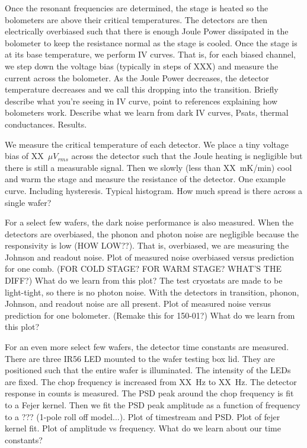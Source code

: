Once the resonant frequencies are determined, the stage is heated so the bolometers are above their critical temperatures. 
The detectors are then electrically overbiased such that there is enough Joule Power dissipated in the bolometer to keep the resistance normal as the stage is cooled. 
Once the stage is at its base temperature, we perform IV curves. 
That is, for each biased channel, we step down the voltage bias (typically in steps of XXX) and measure the current across the bolometer. 
As the Joule Power decreases, the detector temperature decreases and we call this dropping into the transition. 
Briefly describe what you're seeing in IV curve, point to references explaining how bolometers work. 
Describe what we learn from dark IV curves, Psats, thermal conductances. 
Results. 

We measure the critical temperature of each detector. 
We place a tiny voltage bias of XX~$\mu V_{rms}$ across the detector such that the Joule heating is negligible but there is still a measurable signal. 
Then we slowly (less than XX~mK/min) cool and warm the stage and measure the resistance of the detector. 
One example curve. Including hysteresis. 
Typical histogram. How much spread is there across a single wafer?

For a select few wafers, the dark noise performance is also measured. 
When the detectors are overbiased, the phonon and photon noise are negligible because the responsivity is low (HOW LOW??). 
That is, overbiased, we are measuring the Johnson and readout noise. 
Plot of measured noise overbiased versus prediction for one comb. (FOR COLD STAGE? FOR WARM STAGE? WHAT'S THE DIFF?)
What do we learn from this plot? 
The test cryostats are made to be light-tight, so there is no photon noise. 
With the detectors in transition, phonon, Johnson, and readout noise are all present. 
Plot of measured noise versus prediction for one bolometer. (Remake this for 150-01?)
What do we learn from this plot?

For an even more select few wafers, the detector time constants are measured. 
There are three IR56 LED mounted to the wafer testing box lid.
They are positioned such that the entire wafer is illuminated. 
The intensity of the LEDs are fixed. The chop frequency is increased from XX~Hz to XX~Hz. The detector response in counts is measured. The PSD peak around the chop frequency is fit to a Fejer kernel. 
Then we fit the PSD peak amplitude as a function of frequency to a ??? (1-pole roll off model...).
Plot of timestream and PSD. 
Plot of fejer kernel fit. 
Plot of amplitude vs frequency. 
What do we learn about our time constants?


